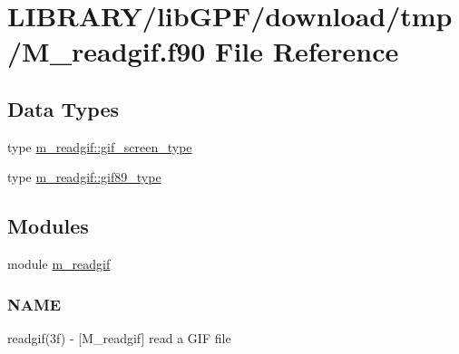 \hypertarget{M__readgif_8f90}{}\section{L\+I\+B\+R\+A\+R\+Y/lib\+G\+P\+F/download/tmp/\+M\+\_\+readgif.f90 File Reference}
\label{M__readgif_8f90}
\subsection*{Data Types}
\begin{DoxyCompactItemize}
\item 
type \hyperlink{structm__readgif_1_1gif__screen__type}{m\+\_\+readgif\+::gif\+\_\+screen\+\_\+type}
\item 
type \hyperlink{structm__readgif_1_1gif89__type}{m\+\_\+readgif\+::gif89\+\_\+type}
\end{DoxyCompactItemize}
\subsection*{Modules}
\begin{DoxyCompactItemize}
\item 
module \hyperlink{namespacem__readgif}{m\+\_\+readgif}
\begin{DoxyCompactList}\small\item\em \subsubsection*{N\+A\+ME}

readgif(3f) -\/ \mbox{[}M\+\_\+readgif\mbox{]} read a G\+IF file \end{DoxyCompactList}\end{DoxyCompactItemize}
